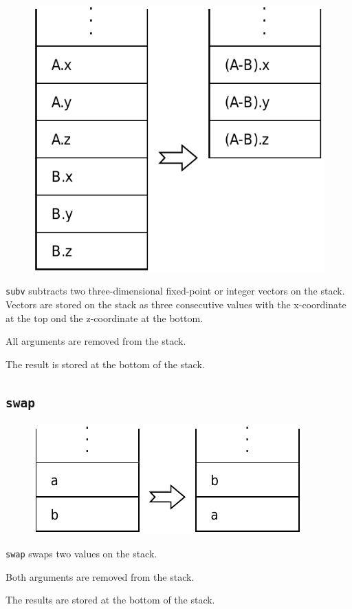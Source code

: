 		\begin{figure}
			\begin{flushright}
				\includegraphics[width=\linewidth]{figure/pdf/i_subv} 
			\end{flushright}
		\end{figure}
	
			\texttt{subv} subtracts two three-dimensional fixed-point or
			integer vectors on the stack. Vectors are stored on the stack as
			three consecutive values with the x-coordinate at the top ond the
			z-coordinate at the bottom.
			
			All arguments are removed from the stack.
			
			The result is stored at the bottom of the stack.
	
	\qquad\qquad 
	
	\subsection*{\texttt{swap}}
	
		\begin{figure}
			\begin{flushright}
				\includegraphics[width=\linewidth]{figure/pdf/i_swap} 
			\end{flushright}
		\end{figure}
	
			\texttt{swap} swaps two values on the stack.
			
			Both arguments are removed from the stack.
			
			The results are stored at the bottom of the stack.
